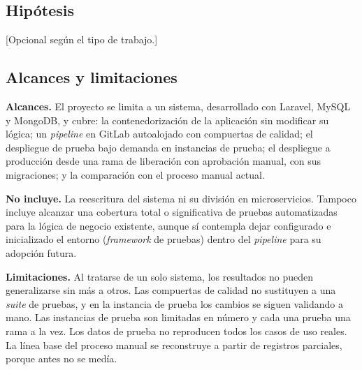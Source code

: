 \subsection{Hipótesis}
[Opcional según el tipo de trabajo.]

\subsection{Alcances y limitaciones}
\textbf{Alcances.} El proyecto se limita a un sistema, desarrollado con Laravel, MySQL y MongoDB, y cubre:
la contenedorización de la aplicación sin modificar su lógica; un \emph{pipeline} en GitLab autoalojado
con compuertas de calidad; el despliegue de prueba bajo demanda en instancias de prueba; el despliegue a
producción desde una rama de liberación con aprobación manual, con sus migraciones; y la comparación
con el proceso manual actual.

\textbf{No incluye.} La reescritura del sistema ni su división en microservicios.
Tampoco incluye alcanzar una cobertura total o significativa de pruebas automatizadas
para la lógica de negocio existente, aunque sí contempla dejar configurado e inicializado
el entorno (\emph{framework} de pruebas) dentro del \emph{pipeline} para su adopción futura.

\textbf{Limitaciones.} Al tratarse de un solo sistema, los resultados no pueden generalizarse
sin más a otros. Las compuertas de calidad no sustituyen a una \emph{suite} de pruebas, y en la
instancia de prueba los cambios se siguen validando a mano. Las instancias de prueba son limitadas
en número y cada una prueba una rama a la vez. Los datos de prueba no reproducen todos los casos de uso
reales. La línea base del proceso manual se reconstruye a partir de registros parciales, porque antes
no se medía.
